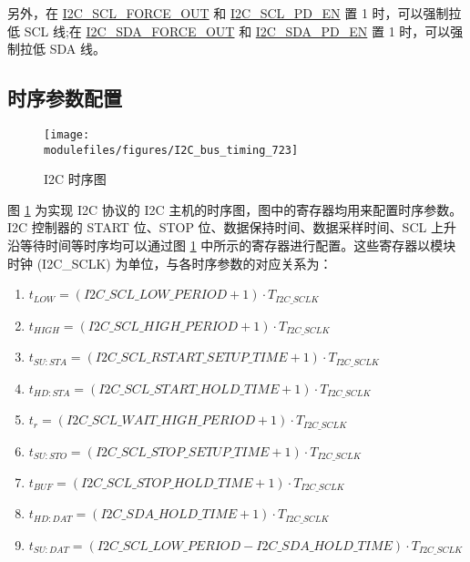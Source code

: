 \documentclass[main\_\_CN.tex]{subfiles}
\begin{document}
另外，在 \hyperref[fielddesc:I2CSCLFORCEOUT]{I2C\_SCL\_FORCE\_OUT} 和 \hyperref[fielddesc:I2CSCLPDEN]{I2C\_SCL\_PD\_EN} 置 1 时，可以强制拉低 SCL 线;在 \hyperref[fielddesc:I2CSDAFORCEOUT]{I2C\_SDA\_FORCE\_OUT} 和 \hyperref[fielddesc:I2CSDAPDEN]{I2C\_SDA\_PD\_EN} 置 1 时，可以强制拉低 SDA 线。

\subsection{时序参数配置}\label{subsec:i2c-timing-para}
\begin{figure}[H]
    \centering
    \texttt{[image: \\modulefiles/figures/I2C\_bus\_timing\_723]}
    \caption{I2C 时序图}
    \label{fig:i2c-bus-timing}
\end{figure}

图 \ref{fig:i2c-bus-timing} 为实现 I2C 协议的 I2C 主机的时序图，图中的寄存器均用来配置时序参数。I2C 控制器的 START 位、STOP 位、数据保持时间、数据采样时间、SCL 上升沿等待时间等时序均可以通过图 \ref{fig:i2c-bus-timing} 中所示的寄存器进行配置。这些寄存器以模块时钟 (I2C\_SCLK)  为单位，与各时序参数的对应关系为：

\begin{enumerate}
\item  $t_{LOW} = (\hyperref[fielddesc:I2CSCLLOWPERIOD]{I2C\_SCL\_LOW\_PERIOD} + 1) \cdot  T_{I2C\_SCLK}$

\item  $t_{HIGH} = (\hyperref[fielddesc:I2CSCLHIGHPERIOD]{I2C\_SCL\_HIGH\_PERIOD} + 1) \cdot  T_{I2C\_SCLK}$

\item  $t_{SU:STA} = (\hyperref[fielddesc:I2CSCLRSTARTSETUPTIME]{I2C\_SCL\_RSTART\_SETUP\_TIME} + 1) \cdot  T_{I2C\_SCLK}$

\item  $t_{HD:STA} = (\hyperref[fielddesc:I2CSCLSTARTHOLDTIME]{I2C\_SCL\_START\_HOLD\_TIME} +1) \cdot  T_{I2C\_SCLK}$

\item  $t_{r} = (\hyperref[fielddesc:I2CSCLWAITHIGHPERIOD]{I2C\_SCL\_WAIT\_HIGH\_PERIOD} + 1 ) \cdot  T_{I2C\_SCLK}$

\item  $t_{SU:STO} = (\hyperref[fielddesc:I2CSCLSTOPSETUPTIME]{I2C\_SCL\_STOP\_SETUP\_TIME}  + 1) \cdot  T_{I2C\_SCLK}$

\item  $t_{BUF} = (\hyperref[fielddesc:I2CSCLSTOPHOLDTIME]{I2C\_SCL\_STOP\_HOLD\_TIME}  + 1) \cdot  T_{I2C\_SCLK}$

\item  $t_{HD:DAT} = (\hyperref[fielddesc:I2CSDAHOLDTIME]{I2C\_SDA\_HOLD\_TIME} +1) \cdot  T_{I2C\_SCLK}$

\item  $t_{SU:DAT} = (\hyperref[fielddesc:I2CSCLLOWPERIOD]{I2C\_SCL\_LOW\_PERIOD} - \hyperref[fielddesc:I2CSDAHOLDTIME]{I2C\_SDA\_HOLD\_TIME}) \cdot  T_{I2C\_SCLK}$
\end{enumerate}
\end{document}
